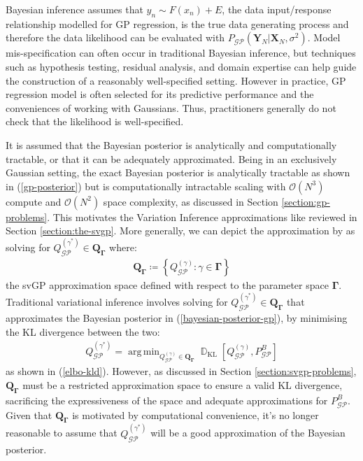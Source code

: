 \documentclass{article}
\newcommand{\D}{\operatorname{\mathbb{D}}}
\newcommand{\GP}{\operatorname{\mathcal{GP}}}
\DeclareMathOperator*{\argmin}{arg\,min}
\numberwithin{equation}{section}
\begin{document}
 Bayesian inference assumes that $y_n \sim F(x_n) + E$, the data input/response relationship modelled for GP regression, is the true data generating process and therefore the data likelihood can be evaluated with $P_{\GP}\left(\mathbf{Y}_N \vert \mathbf{X}_N, \sigma^2\right)$. Model mis-specification can often occur in traditional Bayesian inference, but techniques such as hypothesis testing, residual analysis, and domain expertise can help guide the construction of a reasonably well-specified setting. However in practice, GP regression model is often selected for its predictive performance and the conveniences of working with Gaussians. Thus, practitioners generally do not check that the likelihood is well-specified. 
 
It is assumed that the Bayesian posterior is analytically and computationally tractable, or that it can be adequately approximated. Being in an exclusively Gaussian setting, the exact Bayesian posterior is analytically tractable as shown in (\ref{gp-posterior}) but is computationally intractable scaling with $\mathcal{O}(N^3)$ compute and $\mathcal{O}(N^2)$ space complexity, as discussed in Section \ref{section:gp-problems}. This motivates the Variation Inference approximations like \cite{titsias2009variational} reviewed in Section \ref{section:the-svgp}. More generally, we can depict the approximation by \cite{titsias2009variational} as solving for $Q_{\GP}^{(\gamma^*)} \in \boldsymbol{Q}_{\mathbf{\Gamma}}$ where:
\begin{align}
    \boldsymbol{Q}_{\boldsymbol{\Gamma}} \coloneqq \left\{Q_{\GP}^{(\gamma)}: \gamma \in \mathbf{\Gamma}\right\}
    \label{svgp-space}
\end{align}
the svGP approximation space defined with respect to the parameter space $\mathbf{\Gamma}$. Traditional variational inference involves solving for $Q_{\GP}^{(\gamma^*)} \in \boldsymbol{Q}_{\boldsymbol{\Gamma}}$ that approximates the Bayesian posterior in (\ref{bayesian-posterior-gp}), by minimising the KL divergence between the two: 
\begin{align}
Q^{(\gamma^*)}_{\GP} = \argmin_{Q^{(\gamma)}_{\GP} \in \boldsymbol{Q}_{\boldsymbol{\Gamma}}}\D_{\text{KL}}\left[Q_{\GP}^{(\gamma)}, P_{\GP}^B\right]
\end{align}
as shown in (\ref{elbo-kld}).
However, as discussed in Section \ref{section:svgp-problems}, $\boldsymbol{Q}_{\boldsymbol{\Gamma}}$ must be a restricted approximation space to ensure a valid KL divergence, sacrificing the expressiveness of the space and adequate approximations for $P_{\GP}^B$. Given that $\boldsymbol{Q}_{\boldsymbol{\Gamma}}$ is motivated by computational convenience, it's no longer reasonable to assume that $Q_{\GP}^{(\gamma^*)}$ will be a good approximation of the Bayesian posterior.
\end{document}
